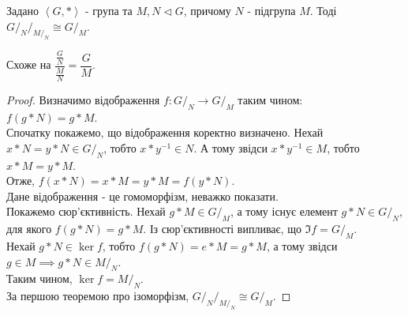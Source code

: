 \documentclass{math_library}
\begin{document}
\begin{theorem}
Задано $\left< G, * \right>$ - група та $M,N \triangleleft G$, причому $N$ - підгрупа $M$. Тоді\\
${\scriptstyle G/_N}/_{M/_N} \cong G/_M$.
\end{theorem}

\begin{remark}
Схоже на $\dfrac{\frac{G}{N}}{\frac{M}{N}} = \dfrac{G}{M}$.
\end{remark}

\begin{proof}
Визначимо відображення $f: G/_N \to G/_M$ таким чином:\\
$f(g*N) = g*M$.\\
Спочатку покажемо, що відображення коректно визначено. Нехай $x*N = y*N \in G/_N$, тобто $x*y^{-1} \in N$. А тому звідси $x*y^{-1} \in M$, тобто $x*M = y*M$.\\
Отже, $f(x*N) = x*M = y*M = f(y*N)$.\\
Дане відображення - це гомоморфізм, неважко показати.\\
Покажемо сюр'єктивність. Нехай $g*M \in G/_M$, а тому існує елемент $g*N \in G/_N$, для якого $f(g*N) = g*M$. Із сюр'єктивності випливає, що $\Im f = G/_M$.\\
Нехай $g*N \in \ker f$, тобто $f(g*N) = e*M = g*M$, а тому звідси $g \in M \implies g*N \in M/_N$.\\
Таким чином, $\ker f = M/_N$.\\
За першою теоремою про ізоморфізм, ${\scriptstyle G/_N}/_{M/_N} \cong G/_M$.
\end{proof}
\newpage

\fi
\end{document}
